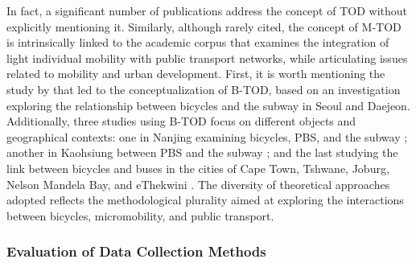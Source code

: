 \begin{refsegment}
In fact, a significant number of publications address the concept of \acrshort{TOD} without explicitly mentioning it. Similarly, although rarely cited, the concept of \acrshort{M-TOD} is intrinsically linked to the academic corpus that examines the integration of light individual mobility with public transport networks, while articulating issues related to mobility and urban development. First, it is worth mentioning the study by \textcolor{blue}{\textcite{lee_bicycle-based_2016}} that led to the conceptualization of \acrshort{B-TOD}, based on an investigation exploring the relationship between bicycles and the subway in Seoul and Daejeon. Additionally, three studies using \acrshort{B-TOD} focus on different objects and geographical contexts: one in Nanjing examining bicycles, \acrshort{PBS}, and the subway \textcolor{blue}{\autocite{ji_public_2017}}; another in Kaohsiung between \acrshort{PBS} and the subway \textcolor{blue}{\autocite{cheng_expanding_2018}}; and the last studying the link between bicycles and buses in the cities of Cape Town, Tshwane, Joburg, Nelson Mandela Bay, and eThekwini \textcolor{blue}{\autocite{cooke_relationship_2018}}. The diversity of theoretical approaches adopted reflects the methodological plurality aimed at exploring the interactions between bicycles, micromobility, and public transport.%

\subsubsection*{Evaluation of Data Collection Methods
    \label{chap2:methodes-collecte-donnees}
    }


\end{refsegment}
